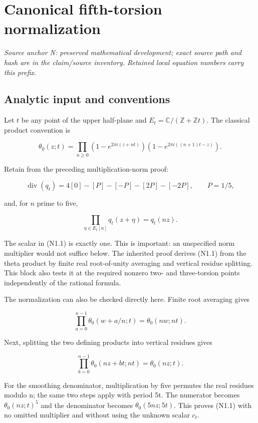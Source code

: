 \section{Canonical fifth-torsion normalization}\label{sec:theta}
\noindent\textit{Source anchor N: preserved mathematical development; exact source path and hash are in the claim/source inventory. Retained local equation numbers carry this prefix.}\par
\hypertarget{N-analytic-input-and-conventions}{%
\subsection{Analytic input and
conventions}\label{N-analytic-input-and-conventions}}

Let \(t\) be any point of the upper half-plane and
\(E_t=\mathbb C/(\mathbb Z+\mathbb Zt)\). The classical product
convention is \cite{BCG}

\[
 \theta_0(z;t)=\prod_{n\ge0}(1-e^{2\pi i(z+nt)})(1-e^{2\pi i((n+1)t-z)}).
\]

Retain from the preceding multiplication-norm proof:

\[
 \operatorname{div}(q_t)=4[0]-[P]-[-P]-[2P]-[-2P],\qquad P=1/5,
\]

and, for \(n\) prime to five,

\[
 \prod_{\eta\in E_t[n]}q_t(z+\eta)=q_t(nz).                  \tag{N1.1}
\]

The scalar in (N1.1) is exactly one. This is important: an unspecified
norm multiplier would not suffice below. The inherited proof derives
(N1.1) from the theta product by finite real root-of-unity averaging and
vertical residue splitting. This block also tests it at the required
nonzero two- and three-torsion points independently of the rational
formula.

The normalization can also be checked directly here. Finite root
averaging gives

\[
 \prod_{a=0}^{n-1}\theta_0(w+a/n;t)=\theta_0(nw;nt).
\]

Next, splitting the two defining products into vertical residues gives

\[
 \prod_{b=0}^{n-1}\theta_0(nz+bt;nt)=\theta_0(nz;t).
\]

For the smoothing denominator, multiplication by five permutes the real
residues modulo n; the same two steps apply with period 5t. The
numerator becomes \(\theta_0(nz;t)^5\) and the denominator becomes
\(\theta_0(5nz;5t)\). This proves (N1.1) with no omitted multiplier and
without using the unknown scalar \(c_t\).

